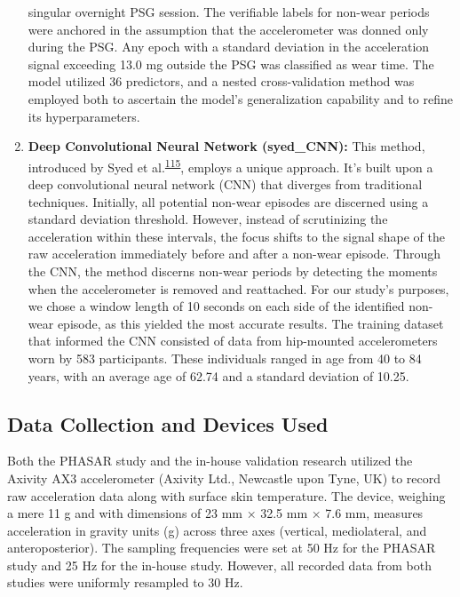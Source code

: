 \documentclass[
  10pt,
]{scrbook}
\let\originaltextbf\textbf
\renewcommand{\textbf}[1]{\textcolor{color1}{\originaltextbf{#1}}}
\begin{document}
\begin{enumerate}
  singular overnight PSG session. The verifiable labels for non-wear
  periods were anchored in the assumption that the accelerometer was
  donned only during the PSG. Any epoch with a standard deviation in the
  acceleration signal exceeding 13.0 mg outside the PSG was classified
  as wear time. The model utilized 36 predictors, and a nested
  cross-validation method was employed both to ascertain the model's
  generalization capability and to refine its hyperparameters.
\item
  \textsf{\textbf{Deep Convolutional Neural Network (syed\_CNN):}} This
  method, introduced by Syed et
  al.\textsuperscript{\protect\hyperlink{ref-syed_novel_2021}{115}},
  employs a unique approach. It's built upon a deep convolutional neural
  network (CNN) that diverges from traditional techniques. Initially,
  all potential non-wear episodes are discerned using a standard
  deviation threshold. However, instead of scrutinizing the acceleration
  within these intervals, the focus shifts to the signal shape of the
  raw acceleration immediately before and after a non-wear episode.
  Through the CNN, the method discerns non-wear periods by detecting the
  moments when the accelerometer is removed and reattached. For our
  study's purposes, we chose a window length of 10 seconds on each side
  of the identified non-wear episode, as this yielded the most accurate
  results. The training dataset that informed the CNN consisted of data
  from hip-mounted accelerometers worn by 583 participants. These
  individuals ranged in age from 40 to 84 years, with an average age of
  62.74 and a standard deviation of 10.25.
\end{enumerate}

\hypertarget{data-collection-and-devices-used}{%
\subsection{Data Collection and Devices
Used}\label{data-collection-and-devices-used}}

Both the PHASAR study and the in-house validation research utilized the
Axivity AX3 accelerometer (Axivity Ltd., Newcastle upon Tyne, UK) to
record raw acceleration data along with surface skin temperature. The
device, weighing a mere 11 g and with dimensions of 23 mm × 32.5 mm ×
7.6 mm, measures acceleration in gravity units (g) across three axes
(vertical, mediolateral, and anteroposterior). The sampling frequencies
were set at 50 Hz for the PHASAR study and 25 Hz for the in-house study.
However, all recorded data from both studies were uniformly resampled to
30 Hz.
\end{document}
